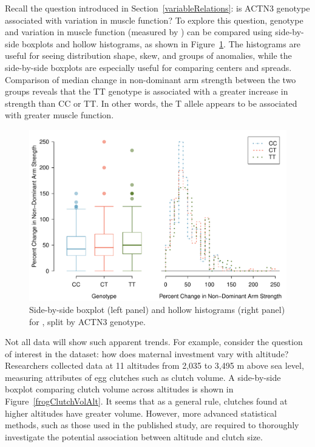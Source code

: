 \begin{doublespace}
Recall the question introduced in Section~\ref{variableRelations}: is ACTN3 genotype associated with variation in muscle function? To explore this question, genotype and variation in muscle function (measured by ) can be compared using side-by-side boxplots and hollow histograms, as shown in Figure~\ref{famussGenoMuscFunc}. The histograms are useful for seeing distribution shape, skew, and groups of anomalies, while the side-by-side boxplots are especially useful for comparing centers and spreads. Comparison of median change in non-dominant arm strength between the two groups reveals that the TT genotype is associated with a greater increase in strength than CC or TT. In other words, the T allele appears to be associated with greater muscle function.

\begin{figure}[h]
   \centering
   \includegraphics[width=\textwidth]{ch_intro_to_data_oi_biostat/figures/famussGenoMuscFunc/famussGenoMuscFunc}
   \caption{Side-by-side boxplot (left panel) and hollow histograms (right panel) for , split by ACTN3 genotype.}
   \label{famussGenoMuscFunc}
\end{figure}



Not all data will show such apparent trends. For example, consider the question of interest in the  dataset: how does maternal investment vary with altitude? Researchers collected data at 11 altitudes from 2,035 to 3,495 m above sea level, measuring attributes of egg clutches such as clutch volume. A side-by-side boxplot comparing clutch volume across altitudes is shown in Figure~\ref{frogClutchVolAlt}. It seems that as a general rule, clutches found at higher altitudes have greater volume. However, more advanced statistical methods, such as those used in the published study, are required to thoroughly investigate the potential association between altitude and clutch size. 


\end{doublespace}
